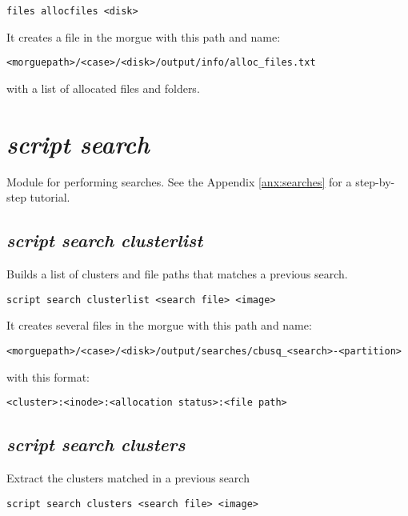 \documentclass[a4paper,11pt,oneside]{report}
\begin{document}
\begin{verbatim}
files allocfiles <disk>
\end{verbatim}

It creates a file in the morgue with this path and name:

\begin{verbatim}
<morguepath>/<case>/<disk>/output/info/alloc_files.txt
\end{verbatim}

with a list of allocated files and folders.





\section{\emph{script search}} \label{script:search}

Module for performing searches. See the Appendix \ref{anx:searches} for a step-by-step tutorial.


\subsection{\emph{script search clusterlist}}

Builds a list of clusters and file paths that matches a previous search.

\begin{verbatim}
script search clusterlist <search file> <image>
\end{verbatim}

It creates several files in the morgue with this path and name:

\begin{verbatim}
<morguepath>/<case>/<disk>/output/searches/cbusq_<search>-<partition>
\end{verbatim}

with this format:

\begin{verbatim}
<cluster>:<inode>:<allocation status>:<file path>
\end{verbatim}



\subsection{\emph{script search clusters}}

Extract the clusters matched in a previous search

\begin{verbatim}
script search clusters <search file> <image>
\end{verbatim}
\end{document}
